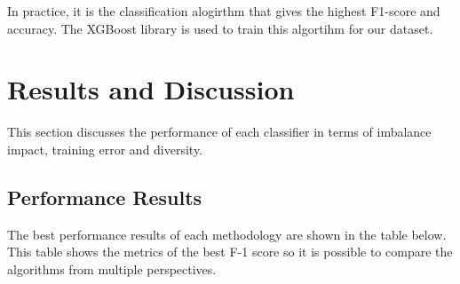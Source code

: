 \documentclass[conference]{IEEEtran}
\begin{document}
In practice, it is the classification alogirthm that gives the highest F1-score and accuracy. The XGBoost library is used to train this algortihm for our dataset.

\section{Results and Discussion}
This section discusses the performance of each classifier in terms of imbalance impact, training error and diversity.

\subsection{Performance Results}

The best performance results of each methodology are shown in the table below. This table shows the metrics of the best F-1 score so it is possible to compare the algorithms from multiple perspectives.
\end{document}
